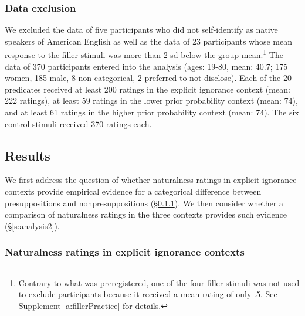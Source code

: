 \documentclass[11pt,fleqn]{article}
\newcommand{\6}{\mbox{$[\hspace*{-.6mm}[$}}
\newcommand{\9}{\mbox{$]\hspace*{-.6mm}]$}}
\begin{document}
\subsubsection{Data exclusion} 

We excluded the data of five participants who did not self-identify as native speakers of American English as well as the data of 23 participants whose mean response to the  filler stimuli was more than 2 sd below the group mean.\footnote{Contrary to what was preregistered, one of the four filler stimuli was not used to exclude participants because it received a mean rating of only .5. See Supplement \ref{a:fillerPractice} for details.} The data of 370 participants entered into the analysis (ages: 19-80, mean: 40.7; 175 women, 185 male, 8 non-categorical, 2 preferred to not disclose). Each of the 20 predicates received at least 200 ratings in the explicit ignorance context (mean: 222 ratings), at least 59 ratings in the lower prior probability context (mean: 74), and at least 61 ratings in the higher prior probability context (mean: 74). The six control stimuli received 370 ratings each. 

\subsection{Results}

We first address the question of whether naturalness ratings in explicit ignorance contexts provide empirical evidence for a categorical difference between presuppositions and nonpresuppositions (\S\ref{s:analysis1}). We then consider whether a comparison of naturalness ratings in the three contexts provides such evidence (\S\ref{s:analysis2}).

\subsubsection{Naturalness ratings in explicit ignorance contexts}\label{s:analysis1}
\end{document}

